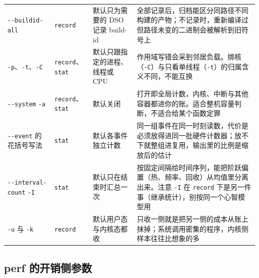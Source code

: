 \documentclass[12pt,a4paper,fontset=fandol]{ctexbook}
\newcommand{\Tp}[1]{\texttt{#1}}
\newcommand{\Opt}[1]{\texttt{-\/-#1}}
\newcommand{\Bk}{\discretionary{}{}{}}
\begin{document}
\begin{longtable}{>{\raggedright\arraybackslash}p{} >{\raggedright\arraybackslash}p{} >{\raggedright\arraybackslash}p{} >{\raggedright\arraybackslash}p{}}
\Opt{buildid-{\Bk}all} & \Tp{record} & 默认只为需要的 DSO 记录 build-id & 全部记录后，归档能区分同路径不同构建的产物；不记录时，重新编译过但路径未变的二进制会被解析到旧符号上 \\
\Tp{-p}、\Tp{-t}、\Tp{-C} & \Tp{record}、\Tp{stat} & 默认只跟指定的进程、线程或 CPU & 作用域写错会采到邻居负载。绑核（\Tp{-C}）与只看单线程（\Tp{-t}）的归属含义不同，不能互换 \\
\Opt{system} \Tp{-a} & \Tp{record}、\Tp{stat} & 默认关闭 & 打开即全局计数，内核、中断与其他容器都进你的账。适合整机容量判断，不适合给某个函数定罪 \\
\Opt{event} 的花括号写法 & \Tp{stat} & 默认各事件独立计数 & 同一组事件在同一时刻读数，代价是必须放得进同一批硬件计数器；放不下就整组进复用，输出里的比例是缩放后的估计 \\
\Opt{interval-{\Bk}count} \Tp{-I} & \Tp{stat} & 默认只在结束时汇总一次 & 按固定间隔给时间序列，能把阶跃偏置（热、频率、回收）从均值里分离出来。注意 \Tp{-I} 在 \Tp{record} 下是另一件事（继承统计），别按同一个心智模型用 \\
\Tp{-u} 与 \Tp{-k} & \Tp{record} & 默认用户态与内核态都收 & 只收一侧就是把另一侧的成本从账上抹掉；系统调用密集的程序，内核侧样本往往比想象的多 \\
\end{longtable}

\subsection{perf 的开销侧参数}
\label{sub:pmapB-perf-cost}
\end{document}
